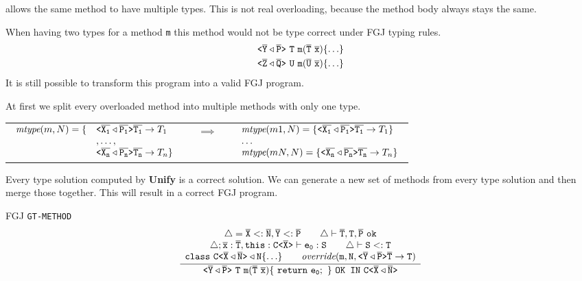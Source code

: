 \documentclass[a4paper,USenglish,cleveref, autoref, thm-restate]{lipics-v2021}
\begin{document}
\TFGJ allows the same method to have multiple types.
This is not real overloading, because the method body always stays the same.

When having two types for a method \texttt{m} this method would not be type correct under FGJ typing rules.
\begin{align*}
  \mathtt{
  \exptype{}{\ol{Y} \triangleleft \ol{P}} \ T\ \texttt{m}(\ol{T}\ \ol{x})\set{\ldots} } \\
  \mathtt{
    \exptype{}{\ol{Z} \triangleleft \ol{Q}} \ U\ \texttt{m}(\ol{U}\ \ol{x})\set{\ldots}
  }
\end{align*}
It is still possible to transform this program into a valid FGJ program.

At first we split every overloaded method into multiple methods with only one type.

\begin{small}
\begin{tabularx}{\textwidth}{cXcXc}
  $\begin{array}{rl}
    \textit{mtype}(m, N) = \{  & \mathtt{ \texttt{<} \overline{\tt X_1}\triangleleft \overline{\tt P_1} \texttt{>} } \overline{\tt T_1} \to T_1  \\
    & , \ldots , \\
    & \mathtt{ \texttt{<} \overline{\tt X_n}\triangleleft \overline{\tt P_n} \texttt{>} } \overline{\tt T_n} \to T_n \}
  \end{array}
  $ & & $\implies$ & & $\begin{array}{l}
    \textit{mtype}(m1, N) = \{   \mathtt{ \texttt{<} \overline{\tt X_1}\triangleleft \overline{\tt P_1} \texttt{>} } \overline{\tt T_1} \to T_1 \}\\
    \ldots \\
    \textit{mtype}(mN, N) = \{   \mathtt{ \texttt{<} \overline{\tt X_n}\triangleleft \overline{\tt P_n} \texttt{>} } \overline{\tt T_n} \to T_n \}\\
  \end{array}$
\end{tabularx}
\end{small}

Every type solution computed by \textbf{Unify} is a correct solution.
We can generate a new set of methods from every type solution and then merge those together.
This will result in a correct FGJ program.

FGJ \texttt{GT-METHOD}
\begin{align*}
\ddfrac{
  \begin{array}{c}
    \mathtt{\triangle = \ol{X} <: \ol{N}, \ol{Y} <: \ol{P} \quad \quad \triangle \vdash \ol{T}, T, \ol{P}\ \texttt{ok}}\\
    \mathtt{\triangle; \ol{x}:\ol{T}, \texttt{this}: \exptype{C}{\ol{X}} \vdash e_0 : S \quad \quad \triangle \vdash S <: T} \\
    \mathtt{\texttt{class}\ \exptype{C}{\ol{X} \triangleleft \ol{N}} \triangleleft N \set{\ldots} \quad \quad \textit{override}(m, N, \exptype{}{\ol{Y} \triangleleft \ol{P}} \ol{T} \to T)}
  \end{array}
}{
  \mathtt{\exptype{}{\ol{Y} \triangleleft \ol{P}}\ T\ \texttt{m}(\ol{T}\ \ol{x})\set{\ \texttt{return}\ e_0;\ } \ \texttt{OK IN}\ \exptype{C}{\ol{X} \triangleleft \ol{N}}}
}
\end{align*}
\end{document}
